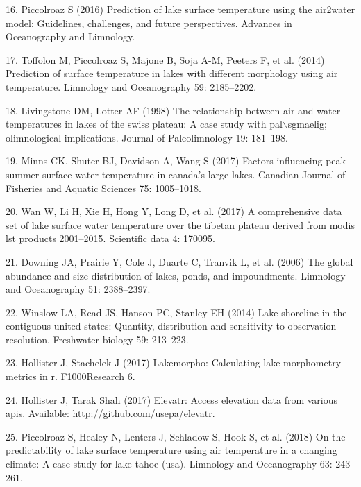 \documentclass[
]{article}
\begin{document}
\leavevmode\hypertarget{ref-piccolroaz2016prediction}{}%
16. Piccolroaz S (2016) Prediction of lake surface temperature using the
air2water model: Guidelines, challenges, and future perspectives.
Advances in Oceanography and Limnology.

\leavevmode\hypertarget{ref-toffolon2014prediction}{}%
17. Toffolon M, Piccolroaz S, Majone B, Soja A-M, Peeters F, et al.
(2014) Prediction of surface temperature in lakes with different
morphology using air temperature. Limnology and Oceanography 59:
2185--2202.

\leavevmode\hypertarget{ref-livingstone1998relationship}{}%
18. Livingstone DM, Lotter AF (1998) The relationship between air and
water temperatures in lakes of the swiss plateau: A case study with
pal\(\backslash\)sgmaelig; olimnological implications. Journal of
Paleolimnology 19: 181--198.

\leavevmode\hypertarget{ref-minns2017factors}{}%
19. Minns CK, Shuter BJ, Davidson A, Wang S (2017) Factors influencing
peak summer surface water temperature in canada's large lakes. Canadian
Journal of Fisheries and Aquatic Sciences 75: 1005--1018.

\leavevmode\hypertarget{ref-wan2017comprehensive}{}%
20. Wan W, Li H, Xie H, Hong Y, Long D, et al. (2017) A comprehensive
data set of lake surface water temperature over the tibetan plateau
derived from modis lst products 2001--2015. Scientific data 4: 170095.

\leavevmode\hypertarget{ref-downing2006global}{}%
21. Downing JA, Prairie Y, Cole J, Duarte C, Tranvik L, et al. (2006)
The global abundance and size distribution of lakes, ponds, and
impoundments. Limnology and Oceanography 51: 2388--2397.

\leavevmode\hypertarget{ref-winslow2014lake}{}%
22. Winslow LA, Read JS, Hanson PC, Stanley EH (2014) Lake shoreline in
the contiguous united states: Quantity, distribution and sensitivity to
observation resolution. Freshwater biology 59: 213--223.

\leavevmode\hypertarget{ref-hollister2017lakemorpho}{}%
23. Hollister J, Stachelek J (2017) Lakemorpho: Calculating lake
morphometry metrics in r. F1000Research 6.

\leavevmode\hypertarget{ref-hollister2017elevatr}{}%
24. Hollister J, Tarak Shah (2017) Elevatr: Access elevation data from
various apis. Available: \url{http://github.com/usepa/elevatr}.

\leavevmode\hypertarget{ref-piccolroaz2018predictability}{}%
25. Piccolroaz S, Healey N, Lenters J, Schladow S, Hook S, et al. (2018)
On the predictability of lake surface temperature using air temperature
in a changing climate: A case study for lake tahoe (usa). Limnology and
Oceanography 63: 243--261.
\end{document}
